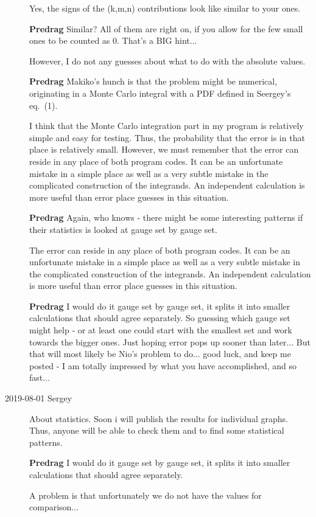 \begin{description}
    Yes, the signs of the (k,m,n) contributions look like similar to your
    ones.


{\bf Predrag} Similar? All of them are right on, if you allow for the few
small ones to be counted as 0. That's a BIG hint...

    However, I do not any guesses about what to do with the absolute values.

{\bf Predrag} Makiko's hunch is that the problem might be numerical,
originating in a Monte Carlo integral with a PDF defined in Seergey's
 eq.~(1).

I think that the Monte Carlo integration part in my program is
relatively simple and easy for testing. Thus, the probability that the
error is in that place is relatively small. However, we must remember
that the error can reside in any place of both program codes. It can be
an unfortunate mistake in a simple place as well as a very subtle
mistake in the complicated construction of the integrands. An
independent calculation is more useful than error place guesses in this
situation.

{\bf Predrag} Again, who knows - there might be some interesting patterns
if their statistics is looked at gauge set by gauge set.

    The error can reside in any place of both program codes. It can be an
    unfortunate mistake in a simple place as well as a very subtle
    mistake in the complicated construction of the integrands. An
    independent calculation is more useful than error place guesses in
    this situation.


{\bf Predrag} I would do it gauge set by gauge set, it splits it into
smaller calculations that should agree separately. So guessing which
gauge set might help - or at least one could start with the smallest set
and work towards the bigger ones. Just hoping error pops up sooner than
later... But that will most likely be Nio's problem to do... good luck,
and keep me posted - I am totally impressed by what you have
accomplished, and so fast...

\item[2019-08-01 Sergey]
About statistics. Soon i will publish the results for individual graphs.
Thus, anyone will be able to check them and to find some statistical
patterns.

{\bf Predrag}
I would do it gauge set by gauge set, it splits it into smaller
calculations that should agree separately.

A problem is that unfortunately we do not have the values for
comparison...


\end{description}

